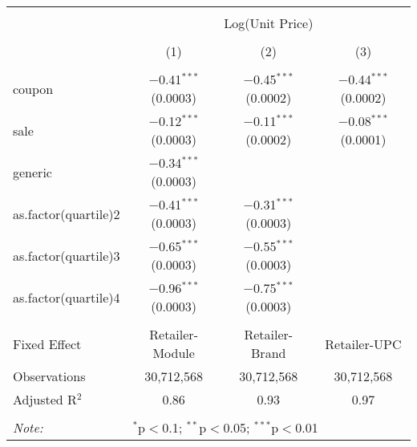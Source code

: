 
\begin{table}[!htbp] \centering 
  \caption{} 
  \label{tab:overallSavingsStorable} 
\begin{tabular}{@{\extracolsep{5pt}}lccc} 
\\[-1.8ex]\hline 
\hline \\[-1.8ex] 
 & \multicolumn{3}{c}{Log(Unit Price)} \\ 
\\[-1.8ex] & (1) & (2) & (3)\\ 
\hline \\[-1.8ex] 
 coupon & $-$0.41$^{***}$ (0.0003) & $-$0.45$^{***}$ (0.0002) & $-$0.44$^{***}$ (0.0002) \\ 
  sale & $-$0.12$^{***}$ (0.0003) & $-$0.11$^{***}$ (0.0002) & $-$0.08$^{***}$ (0.0001) \\ 
  generic & $-$0.34$^{***}$ (0.0003) &  &  \\ 
  as.factor(quartile)2 & $-$0.41$^{***}$ (0.0003) & $-$0.31$^{***}$ (0.0003) &  \\ 
  as.factor(quartile)3 & $-$0.65$^{***}$ (0.0003) & $-$0.55$^{***}$ (0.0003) &  \\ 
  as.factor(quartile)4 & $-$0.96$^{***}$ (0.0003) & $-$0.75$^{***}$ (0.0003) &  \\ 
 \hline \\[-1.8ex] 
Fixed Effect & Retailer-Module & Retailer-Brand & Retailer-UPC \\ 
Observations & 30,712,568 & 30,712,568 & 30,712,568 \\ 
Adjusted R$^{2}$ & 0.86 & 0.93 & 0.97 \\ 
\hline 
\hline \\[-1.8ex] 
\textit{Note:}  & \multicolumn{3}{l}{$^{*}$p$<$0.1; $^{**}$p$<$0.05; $^{***}$p$<$0.01} \\ 
\end{tabular} 
\end{table} 
